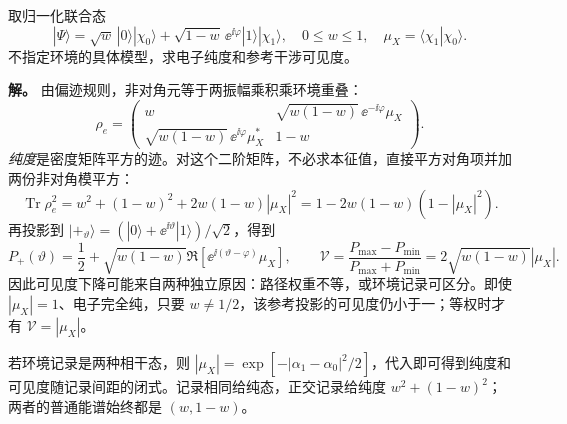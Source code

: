 \begin{exbox}[不等权两通道的纯度与干涉可见度]
取归一化联合态
\begin{equation*}
 |\Psi\rangle=\sqrt{w}\,|0\rangle|\chi_0\rangle
 +\sqrt{1-w}\,\ee^{\ii\varphi}|1\rangle|\chi_1\rangle,
 \quad 0\le w\le1,\quad \mu_X=\langle\chi_1|\chi_0\rangle.
\end{equation*}
不指定环境的具体模型，求电子纯度和参考干涉可见度。

\textbf{解。} 由偏迹规则，非对角元等于两振幅乘积乘环境重叠：
\begin{equation*}
 \rho_e=\begin{pmatrix}
 w&\sqrt{w(1-w)}\,\ee^{-\ii\varphi}\mu_X\\
 \sqrt{w(1-w)}\,\ee^{\ii\varphi}\mu_X^*&1-w
 \end{pmatrix}.
\end{equation*}
\emph{纯度}是密度矩阵平方的迹。对这个二阶矩阵，不必求本征值，直接平方对角项并加两份非对角模平方：
\begin{equation*}
 \operatorname{Tr}\rho_e^2
 =w^2+(1-w)^2+2w(1-w)|\mu_X|^2
 =1-2w(1-w)(1-|\mu_X|^2).
\end{equation*}
再投影到 $|+_\vartheta\rangle=(|0\rangle+\ee^{\ii\vartheta}|1\rangle)/\sqrt2$，得到
\begin{equation*}
 P_+(\vartheta)=\frac12+\sqrt{w(1-w)}
 \Re[\ee^{\ii(\vartheta-\varphi)}\mu_X],\qquad
 \mathcal V=\frac{P_{\max}-P_{\min}}{P_{\max}+P_{\min}}
 =2\sqrt{w(1-w)}|\mu_X|.
\end{equation*}
因此可见度下降可能来自两种独立原因：路径权重不等，或环境记录可区分。即使 $|\mu_X|=1$、电子完全纯，只要 $w\ne1/2$，该参考投影的可见度仍小于一；等权时才有 $\mathcal V=|\mu_X|$。

若环境记录是两种相干态，则
$|\mu_X|=\exp[-|\alpha_1-\alpha_0|^2/2]$，代入即可得到纯度和可见度随记录间距的闭式。记录相同给纯态，正交记录给纯度 $w^2+(1-w)^2$；两者的普通能谱始终都是 $(w,1-w)$。
\end{exbox}

